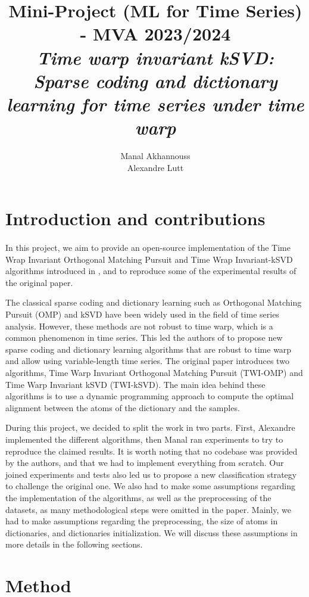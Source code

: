 \documentclass[11pt]{article}
\title{Mini-Project (ML for Time Series) - MVA 2023/2024 \\ \Large{\textit{Time warp invariant kSVD:\\ Sparse coding and dictionary learning for time series under time warp}}}
\author{
Manal Akhannouss \email{manal.akhannouss@eleves.enpc.fr} \\
Alexandre Lutt \email{alexandre.lutt@eleves.enpc.fr}
}
\begin{document}
\maketitle

\section{Introduction and contributions}

\paragraph{} In this project, we aim to provide an open-source implementation of the Time Wrap Invariant Orthogonal Matching Pursuit and Time Wrap Invariant-kSVD algorithms introduced in \cite{main_paper}, and to reproduce some of the experimental results of the original paper. 

The classical sparse coding and dictionary learning such as Orthogonal Matching Pursuit (OMP) and kSVD have been widely used in the field of time series analysis. However, these methods are not robust to time warp, which is a common phenomenon in time series. This led the authors of \cite{main_paper} to propose new sparse coding and dictionary learning algorithms that are robust to time warp and allow using variable-length time series. The original paper introduces two algorithms, Time Warp Invariant Orthogonal Matching Pursuit (TWI-OMP) and Time Warp Invariant kSVD (TWI-kSVD). The main idea behind these algorithms is to use a dynamic programming approach to compute the optimal alignment between the atoms of the dictionary and the samples.

During this project, we decided to split the work in two parts. First, Alexandre implemented the different algorithms, then Manal ran experiments to try to reproduce the claimed results. It is worth noting that no codebase was provided by the authors, and that we had to implement everything from scratch. Our joined experiments and tests also led us to propose a new classification strategy to challenge the original one. We also had to make some assumptions regarding the implementation of the algorithms, as well as the preprocessing of the datasets, as many methodological steps were omitted in the paper. Mainly, we had to make assumptions regarding the preprocessing, the size of atoms in dictionaries, and dictionaries initialization. We will discuss these assumptions in more details in the following sections.

\section{Method}
\end{document}
